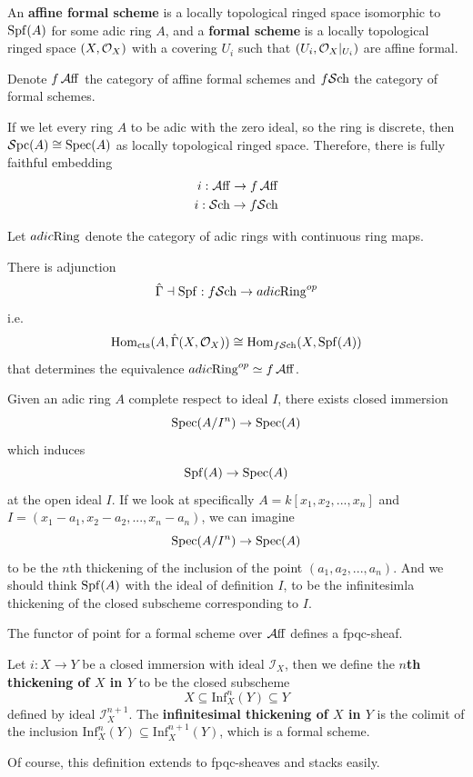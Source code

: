 \begin{definition}
    An \textbf{affine formal scheme} is a locally topological ringed space isomorphic to $\operatorname{\mathrm{Spf}}(A)$ for some adic ring $A$, and a \textbf{formal scheme} is a locally topological ringed space $(X, \mathcal{O}_X)$ with a covering $U_i$ such that $(U_i, \mathcal{O}_X|_{U_i})$ are affine formal.

    Denote $f\operatorname{\mathcal{A}ff}$ the category of affine formal schemes and $f\mathcal{S}\mathrm{ch}$ the category of formal schemes.
\end{definition}

If we let every ring $A$ to be adic with the zero ideal, so the ring is discrete, then $\operatorname{\mathcal{S}pc}(A)\cong\operatorname{\mathrm{Spec}}(A)$ as locally topological ringed space. Therefore, there is fully faithful embedding 
\begin{align*}
    i: \operatorname{\mathcal{A}ff} \to f\operatorname{\mathcal{A}ff}
    \\ i: \mathcal{S}\mathrm{ch} \to f\mathcal{S}\mathrm{ch}
\end{align*}

Let $adic\mathrm{Ring}$ denote the category of adic rings with continuous ring maps.
\begin{theorem}
    There is adjunction
    \[
       \hat{\Gamma}\dashv \operatorname{\mathrm{Spf}}: f\mathcal{S}\mathrm{ch}\to adic\mathrm{Ring}^{op}
    \]i.e.
    \[
    \operatorname{Hom}_{\mathrm{cts}}(A, \hat{\Gamma}(X, \mathcal{O}_X))\cong \operatorname{Hom}_{f\mathcal{S}\mathrm{ch}}(X, \operatorname{\mathrm{Spf}}(A))
    \]that determines the equivalence $adic\mathrm{Ring}^{op}\simeq f\operatorname{\mathcal{A}ff}$.
\end{theorem}

\begin{remark}
    Given an adic ring $A$ complete respect to ideal $I$, there exists closed immersion
    \[
    \operatorname{\mathrm{Spec}}(A/I^n)\to \operatorname{\mathrm{Spec}}(A)
    \]which induces
    \[
    \operatorname{\mathrm{Spf}}(A)\to \operatorname{\mathrm{Spec}}(A)
    \]at the open ideal $I$. If we look at specifically $A=k[x_1,x_2,...,x_n]$ and $I=(x_1-a_1,x_2-a_2,..., x_n-a_n)$, we can imagine
    \[
    \operatorname{\mathrm{Spec}}(A/I^n)\to \operatorname{\mathrm{Spec}}(A)
    \]to be the $n$th thickening of the inclusion of the point $(a_1,a_2,...,a_n)$. And we should think $\operatorname{\mathrm{Spf}}(A)$ with the ideal of definition $I$, to be the infinitesimla thickening of the closed subscheme corresponding to $I$.
\end{remark}

The functor of point for a formal scheme over $\operatorname{\mathcal{A}ff}$ defines a fpqc-sheaf.

\begin{definition}
    Let $i: X\to Y$ be a closed immersion with ideal $\mathcal{I}_X$, then we define the \textbf{$n$th thickening of $X$ in $Y$} to be the closed subscheme
    \[
    X\subseteq \mathrm{Inf}^n_X(Y)\subseteq Y
    \]defined by ideal $\mathcal{I}_X^{n+1}$. The \textbf{infinitesimal thickening of $X$ in $Y$} is the colimit of the inclusion $\mathrm{Inf}^n_X(Y)\subseteq \mathrm{Inf}^{n+1}_X(Y)$, which is a formal scheme.

    Of course, this definition extends to fpqc-sheaves and stacks easily.
\end{definition}

